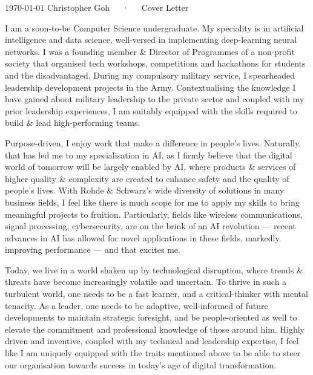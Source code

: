 \documentclass[11pt, a4paper]{awesome-cv}
\begin{document}
\makecvheader[R]

\makecvfooter
  {\today}
  {Christopher Goh~~~·~~~Cover Letter}
  {}

\makelettertitle

\begin{cvletter}

I am a soon-to-be Computer Science undergraduate. My speciality is in artificial intelligence and data science, well-versed in implementing deep-learning neural networks. I was a founding member \& Director of Programmes of a non-profit society that organised tech workshops, competitions and hackathons for students and the disadvantaged. During my compulsory military service, I spearheaded leadership development projects in the Army. Contextualising the knowledge I have gained about military leadership to the private sector and coupled with my prior leadership experiences, I am suitably equipped with the skills required to build \& lead high-performing teams.

Purpose-driven, I enjoy work that make a difference in people's lives. Naturally, that has led me to my specialisation in AI, as I firmly believe that the digital world of tomorrow will be largely enabled by AI, where products \& services of higher quality \& complexity are created to enhance safety and the quality of people's lives. With Rohde \& Schwarz's wide diversity of solutions in many business fields, I feel like there is much scope for me to apply my skills to bring meaningful projects to fruition. Particularly, fields like wireless communications, signal processing, cybersecurity, are on the brink of an AI revolution --- recent advances in AI has allowed for novel applications in these fields, markedly improving performance --- and that excites me.


Today, we live in a world shaken up by technological disruption, where trends \& threats have become increasingly volatile and uncertain. To thrive in such a turbulent world, one needs to be a fast learner, and a critical-thinker with mental tenacity. As a leader, one needs to be adaptive, well-informed of future developments to maintain strategic foresight, and be people-oriented as well to elevate the commitment and professional knowledge of those around him. Highly driven and inventive, coupled with my technical and leadership expertise, I feel like I am uniquely equipped with the traits mentioned above to be able to steer our organisation towards success in today's age of digital transformation.

\end{cvletter}


\makeletterclosing
\end{document}
